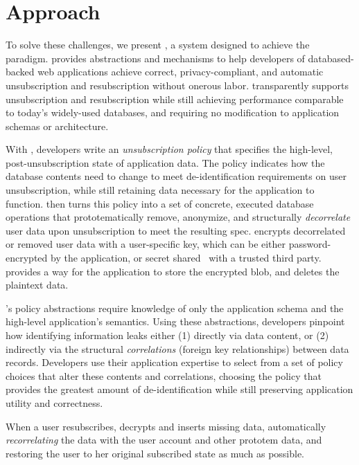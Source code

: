 \section{Approach}
To solve these challenges, we present \proto, a system designed to achieve the \sys paradigm.
\proto provides abstractions and mechanisms to help developers of databased-backed web applications
achieve correct, privacy-compliant, and automatic unsubscription and resubscription without onerous
labor.
\proto transparently supports unsubscription and resubscription while still achieving performance
comparable to today’s widely-used databases, and requiring no modification to application schemas or
architecture.

With \proto, developers write an \emph{unsubscription policy} that specifies the high-level,
post-unsubscription state of application data.  The policy indicates how the database contents need
to change to meet de-identification requirements on user unsubscription, while still retaining data
necessary for the application to function. \proto then turns this policy into a set of concrete,
executed database operations that prototematically remove, anonymize, and structurally
\emph{decorrelate} user data upon unsubscription to meet the resulting spec. \proto 
encrypts decorrelated or removed user data with a user-specific key, which can be either
password-encrypted by the application, or secret shared~\cite{secretsharing} with a trusted third
party. \proto provides a way for the application to store the encrypted blob, and deletes the plaintext
data.

\proto's policy abstractions require knowledge of only the application schema and the high-level
application's semantics. Using these abstractions, developers pinpoint how identifying information
leaks either (1) directly via data content, or (2) indirectly via the structural \emph{correlations}
(foreign key relationships) between data records. Developers use their application expertise to
select from a set of policy choices that alter these contents and correlations, choosing the policy
that provides the greatest amount of de-identification while still preserving application
utility and correctness.

When a user resubscribes, \proto decrypts and inserts missing data, automatically
\emph{recorrelating} the data with the user account and other prototem data, and restoring the user to her
original subscribed state as much as possible.


